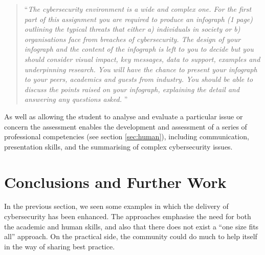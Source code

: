 \documentclass[conference]{IEEEtran}
\begin{document}
\begin{quote}
``{\emph{The cybersecurity environment is a wide and complex one. For the first part of this assignment you are required to produce an infograph (1 page) outlining the typical threats that either a) individuals in society or b) organisations face from breaches of cybersecurity. The design of your infograph and the content of the infograph is left to you to decide but you should consider visual impact, key messages, data to support, examples and underpinning research. You will have the chance to present your infograph to your peers, academics and guests from industry. You should be able to discuss the points raised on your infograph, explaining the detail and answering any questions asked. }}''
\end{quote}

As well as allowing the student to analyse and evaluate a particular
issue or concern the assessment enables the development and assessment
of a series of professional competencies (see section
\ref{sec:human}), including communication, presentation skills, and
the summarising of complex cybersecurity issues.

\section{Conclusions and Further Work}

In the previous section, we seen some examples in which the delivery
of cybersecurity has been enhanced. The approaches emphasise the need
for both the academic and human skills, and also that there does not
exist a ``one size fits all'' approach. On the practical side, the
community could do much to help itself in the way of sharing best
practice.
\end{document}
